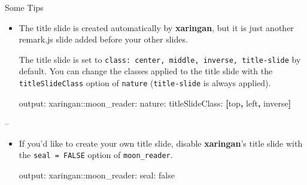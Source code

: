 \documentclass[ignorenonframetext,]{beamer}
\newenvironment{Shaded}{\begin{snugshade}}{\end{snugshade}}
\newcommand{\AttributeTok}[1]{\textcolor[rgb]{0.77,0.63,0.00}{#1}}
\newcommand{\FunctionTok}[1]{\textcolor[rgb]{0.00,0.00,0.00}{#1}}
\newcommand{\KeywordTok}[1]{\textcolor[rgb]{0.13,0.29,0.53}{\textbf{#1}}}
\newcommand{\NormalTok}[1]{#1}
\begin{document}
\begin{frame}[fragile]{Some Tips}
\protect\hypertarget{some-tips-2}{}

\begin{itemize}
\item
  The title slide is created automatically by \textbf{xaringan}, but it
  is just another remark.js slide added before your other slides.

  The title slide is set to
  \texttt{class:\ center,\ middle,\ inverse,\ title-slide} by default.
  You can change the classes applied to the title slide with the
  \texttt{titleSlideClass} option of \texttt{nature}
  (\texttt{title-slide} is always applied).

\begin{Shaded}
\begin{Highlighting}[]
\FunctionTok{output:}
  \FunctionTok{xaringan:}\AttributeTok{:moon_reader:}
    \FunctionTok{nature:}
      \FunctionTok{titleSlideClass:}\AttributeTok{ }\KeywordTok{[}\NormalTok{top}\KeywordTok{,}\NormalTok{ left}\KeywordTok{,}\NormalTok{ inverse}\KeywordTok{]}
\end{Highlighting}
\end{Shaded}
\end{itemize}

--

\begin{itemize}
\item
  If you'd like to create your own title slide, disable
  \textbf{xaringan}'s title slide with the \texttt{seal\ =\ FALSE}
  option of \texttt{moon\_reader}.

\begin{Shaded}
\begin{Highlighting}[]
\FunctionTok{output:}
  \FunctionTok{xaringan:}\AttributeTok{:moon_reader:}
    \FunctionTok{seal:}\AttributeTok{ false}
\end{Highlighting}
\end{Shaded}
\end{itemize}

\end{frame}
\end{document}
